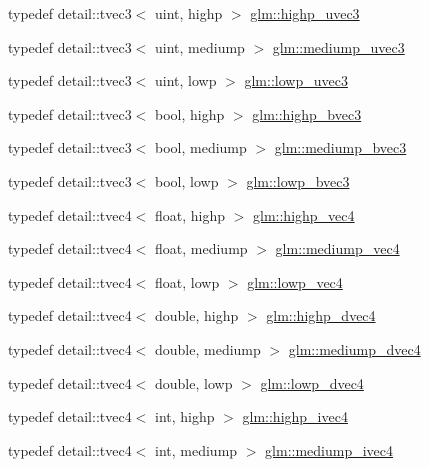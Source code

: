 \begin{DoxyCompactItemize}
\item 
typedef detail\+::tvec3$<$ uint, highp $>$ \hyperlink{group__core__precision_ga66d0e4ae1742ede2eb32bf0bfedd7474}{glm\+::highp\+\_\+uvec3}
\item 
typedef detail\+::tvec3$<$ uint, mediump $>$ \hyperlink{group__core__precision_gaebdefe98b08421ef645f65c706af46b2}{glm\+::mediump\+\_\+uvec3}
\item 
typedef detail\+::tvec3$<$ uint, lowp $>$ \hyperlink{group__core__precision_ga26fd88e52fe7003d41b0c57c5edffd6e}{glm\+::lowp\+\_\+uvec3}
\item 
typedef detail\+::tvec3$<$ bool, highp $>$ \hyperlink{group__core__precision_ga1d77a773fdd024602413670788c10c62}{glm\+::highp\+\_\+bvec3}
\item 
typedef detail\+::tvec3$<$ bool, mediump $>$ \hyperlink{group__core__precision_gae7c8d0136e829d6fe3feb00856e35f11}{glm\+::mediump\+\_\+bvec3}
\item 
typedef detail\+::tvec3$<$ bool, lowp $>$ \hyperlink{group__core__precision_ga17ac2986f7b315a2ac4ee2662b5be9cb}{glm\+::lowp\+\_\+bvec3}
\item 
typedef detail\+::tvec4$<$ float, highp $>$ \hyperlink{group__core__precision_gae32d5f99860247afbe7ed90564bceac1}{glm\+::highp\+\_\+vec4}
\item 
typedef detail\+::tvec4$<$ float, mediump $>$ \hyperlink{group__core__precision_ga2527a7f322907fecd58bef0a7a9c3ecd}{glm\+::mediump\+\_\+vec4}
\item 
typedef detail\+::tvec4$<$ float, lowp $>$ \hyperlink{group__core__precision_ga706ad1296c1cdcbd26c815fbb0f3f846}{glm\+::lowp\+\_\+vec4}
\item 
typedef detail\+::tvec4$<$ double, highp $>$ \hyperlink{group__core__precision_gad5ff5ff4a69e6925f5b4f540e2633835}{glm\+::highp\+\_\+dvec4}
\item 
typedef detail\+::tvec4$<$ double, mediump $>$ \hyperlink{group__core__precision_gac61cf2fc2df895e5f277c978dace042a}{glm\+::mediump\+\_\+dvec4}
\item 
typedef detail\+::tvec4$<$ double, lowp $>$ \hyperlink{group__core__precision_gad04432e5d5accf764e10c6674e5d0c96}{glm\+::lowp\+\_\+dvec4}
\item 
typedef detail\+::tvec4$<$ int, highp $>$ \hyperlink{group__core__precision_gaeba08fcf78aeae954c3335d73500ff8b}{glm\+::highp\+\_\+ivec4}
\item 
typedef detail\+::tvec4$<$ int, mediump $>$ \hyperlink{group__core__precision_gaa4c23a132d76436e041747b0c03265ad}{glm\+::mediump\+\_\+ivec4}

\end{DoxyCompactItemize}
